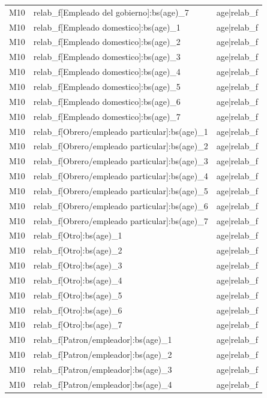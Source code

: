 \begin{longtable}{lll}
M10 & relab\_f[Empleado del gobierno]:bs(age)\_7 & age|relab\_f \\
M10 & relab\_f[Empleado domestico]:bs(age)\_1 & age|relab\_f \\
M10 & relab\_f[Empleado domestico]:bs(age)\_2 & age|relab\_f \\
M10 & relab\_f[Empleado domestico]:bs(age)\_3 & age|relab\_f \\
M10 & relab\_f[Empleado domestico]:bs(age)\_4 & age|relab\_f \\
M10 & relab\_f[Empleado domestico]:bs(age)\_5 & age|relab\_f \\
M10 & relab\_f[Empleado domestico]:bs(age)\_6 & age|relab\_f \\
M10 & relab\_f[Empleado domestico]:bs(age)\_7 & age|relab\_f \\
M10 & relab\_f[Obrero/empleado particular]:bs(age)\_1 & age|relab\_f \\
M10 & relab\_f[Obrero/empleado particular]:bs(age)\_2 & age|relab\_f \\
M10 & relab\_f[Obrero/empleado particular]:bs(age)\_3 & age|relab\_f \\
M10 & relab\_f[Obrero/empleado particular]:bs(age)\_4 & age|relab\_f \\
M10 & relab\_f[Obrero/empleado particular]:bs(age)\_5 & age|relab\_f \\
M10 & relab\_f[Obrero/empleado particular]:bs(age)\_6 & age|relab\_f \\
M10 & relab\_f[Obrero/empleado particular]:bs(age)\_7 & age|relab\_f \\
M10 & relab\_f[Otro]:bs(age)\_1 & age|relab\_f \\
M10 & relab\_f[Otro]:bs(age)\_2 & age|relab\_f \\
M10 & relab\_f[Otro]:bs(age)\_3 & age|relab\_f \\
M10 & relab\_f[Otro]:bs(age)\_4 & age|relab\_f \\
M10 & relab\_f[Otro]:bs(age)\_5 & age|relab\_f \\
M10 & relab\_f[Otro]:bs(age)\_6 & age|relab\_f \\
M10 & relab\_f[Otro]:bs(age)\_7 & age|relab\_f \\
M10 & relab\_f[Patron/empleador]:bs(age)\_1 & age|relab\_f \\
M10 & relab\_f[Patron/empleador]:bs(age)\_2 & age|relab\_f \\
M10 & relab\_f[Patron/empleador]:bs(age)\_3 & age|relab\_f \\
M10 & relab\_f[Patron/empleador]:bs(age)\_4 & age|relab\_f \\

\end{longtable}

